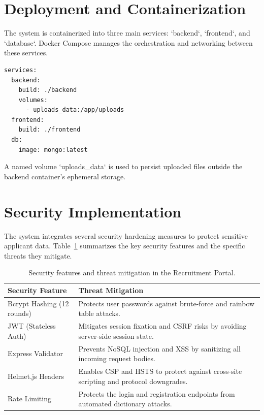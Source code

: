 \section{Deployment and Containerization}

The system is containerized into three main services: `backend`, `frontend`, and `database`. Docker Compose manages the orchestration and networking between these services.

\begin{lstlisting}[language=bash, caption={Docker Compose service overview.}]
services:
  backend:
    build: ./backend
    volumes:
      - uploads_data:/app/uploads
  frontend:
    build: ./frontend
  db:
    image: mongo:latest
\end{lstlisting}

A named volume `uploads_data` is used to persist uploaded files outside the backend container's ephemeral storage.

\section{Security Implementation}

The system integrates several security hardening measures to protect sensitive applicant data. Table~\ref{tab:security} summarizes the key security features and the specific threats they mitigate.

\begin{table}[H]
  \centering
  \caption{Security features and threat mitigation in the Recruitment Portal.}
  \label{tab:security}
  \begin{tabularx}{\textwidth}{lX}
    \hline
    \textbf{Security Feature} & \textbf{Threat Mitigation} \\
    \hline
    Bcrypt Hashing (12 rounds) & Protects user passwords against brute-force and rainbow table attacks. \\
    JWT (Stateless Auth)       & Mitigates session fixation and CSRF risks by avoiding server-side session state. \\
    Express Validator          & Prevents NoSQL injection and XSS by sanitizing all incoming request bodies. \\
    Helmet.js Headers          & Enables CSP and HSTS to protect against cross-site scripting and protocol downgrades. \\
    Rate Limiting              & Protects the login and registration endpoints from automated dictionary attacks. \\
    \hline
  \end{tabularx}
\end{table}

